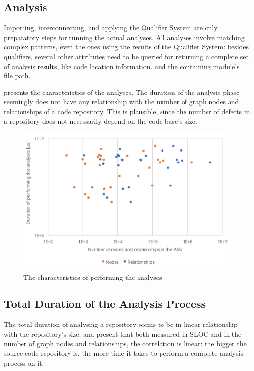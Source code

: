 \subsection{Analysis}

Importing, interconnecting, and applying the Qualifier System are only preparatory steps for running the actual analyses. All analyses involve matching complex patterns, even the ones using the results of the Qualifier System: besides qualifiers, several other attributes need to be queried for returning a complete set of analysis results, like code location information, and the containing module's file path.

 presents the characteristics of the analyses. The duration of the analysis phase seemingly does not have any relationship with the number of graph nodes and relationships of a code repository. This is plausible, since the number of defects in a repository does not necessarily depend on the code base's size.

\begin{figure}[!htb]
	\centerfloat
	\includegraphics[width=\textwidth,clip]{figures/measurement-analysis-nodes-relationships.pdf}
	\caption{The characteristics of performing the analyses}
	\label{fig:measurement-analysis-nodes-relationships}
\end{figure}

\subsection{Total Duration of the Analysis Process}

The total duration of analysing a repository seems to be in linear relationship with the repository's size.  and  present that both measured in SLOC and in the number of graph nodes and relationships, the correlation is linear: the bigger the source code repository is, the more time it takes to perform a complete analysis process on it.

